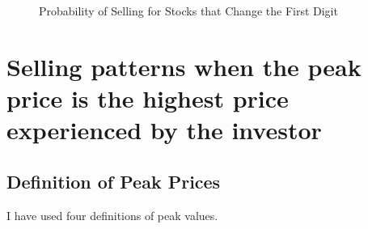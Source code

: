 \begin{figure}[hp]
	\centering%
	\caption{Probability of Selling  for Stocks that Change the First Digit}%
	\label{fig:bars_probthird}%
	\fignote{  }
\end{figure}



\clearpage
\section{Selling patterns when the peak price is the highest price experienced by the investor}

\subsection{Definition of Peak Prices}
I have used four definitions of peak values. 

